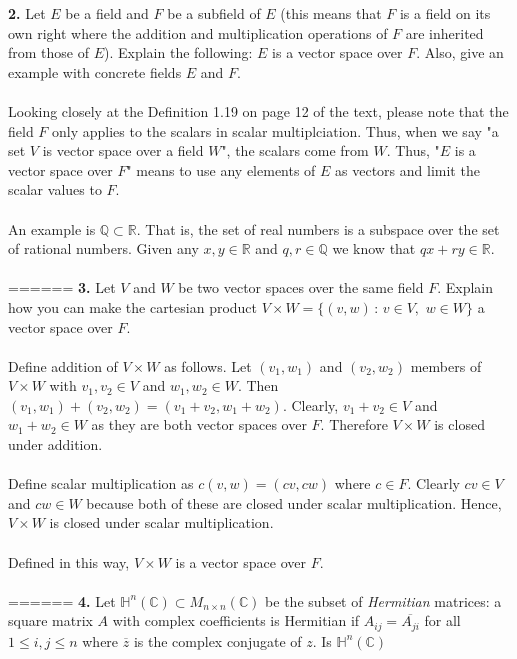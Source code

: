 \documentclass[11pt]{amsart}
\theoremstyle{definition}  %
\newcommand{\Q}{\mathbb{Q}}
\newcommand{\R}{\mathbb{R}}
\newcommand{\C}{\mathbb{C}}
\begin{document}
\vskip 0.1cm
\noindent
{\bf 2.} Let $E$ be a field and $F$ be a subfield of $E$ (this means that $F$ 
is a field on its own right where the addition and multiplication operations of $F$ are inherited from those of $E$). 
Explain the following: $E$ is a vector space over $F$. Also, give an example with concrete fields $E$ and $F$.\\ 
\\
Looking closely at the Definition 1.19 on page 12 of the text, please note that the field $F$ only applies to the scalars in scalar multiplciation.  Thus, when we say "a set $V$ is vector space over a field $W$", the scalars come from $W$.  Thus, "$E$ is a vector space over $F$" means to use any elements of $E$ as vectors and limit the scalar values to $F$.\\
\\
An example is $\Q \subset \R$.  That is, the set of real numbers is a subspace over the set of rational numbers.  Given any $x,y \in \R$ and $q,r \in \Q$ we know that $qx+ry \in \R$.\\
\\
======
\vskip 0.1cm
\noindent
{\bf 3.} Let $V$ and $W$ be two vector spaces over the same field $F$. Explain how you can 
make the cartesian product $V \times W = \{(v,w) \, : \, v \in V, \,\, w \in W\}$ a vector space over $F$. \\
\\
Define addition of $V \times W$ as follows.  Let $(v_1,w_1)$ and $(v_2, w_2)$ members of $V \times W$ with $v_1,v_2 \in V$ and $w_1,w_2 \in W$.  Then $(v_1,w_1)+(v_2,w_2)=(v_1+v_2,w_1+w_2)$.  Clearly, $v_1+v_2\in V$ and $w_1+w_2 \in W$ as they are both vector spaces over $F$.  Therefore $V\times W$ is closed under addition.\\
\\
Define scalar multiplication as $c(v,w)=(cv,cw)$ where $c \in F$.  Clearly $cv\in V$ and $cw\in W$ because both of these are closed under scalar multiplication.  Hence, $V\times W$ is closed under scalar multiplication.\\
\\
Defined in this way, $V \times W$ is a vector space over $F$.\\
\\
======
\newpage
\vskip 0.1cm
\noindent
{\bf 4.} Let $\mathbb{H}^n(\C) \subset M_{n \times n}(\C)$ be the subset of {\it Hermitian} matrices:  a square matrix $A$ with complex coefficients
is Hermitian if $A_{ij} = \overline{A_{ji}}$ for all $1 \leq i,j \leq n$ where $\overline{z}$ is the complex conjugate of $z$. Is $\mathbb{H}^n(\C)$
\end{document}
